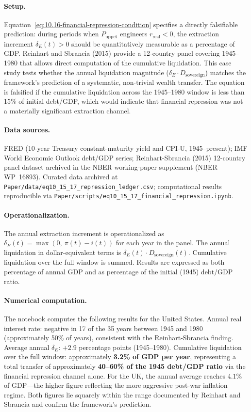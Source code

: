 \paragraph{Setup.}
Equation~\eqref{eq:10.16-financial-repression-condition} specifies a directly falsifiable prediction: during periods when $P_{\text{uppet}}$ engineers $r_{\text{real}} < 0$, the extraction increment $\delta_E(t) > 0$ should be quantitatively measurable as a percentage of GDP. Reinhart and Sbrancia (2015) provide a 12-country panel covering 1945--1980 that allows direct computation of the cumulative liquidation. This case study tests whether the annual liquidation magnitude ($\delta_E \cdot D_{\text{sovereign}}$) matches the framework's prediction of a systematic, non-trivial wealth transfer. The equation is falsified if the cumulative liquidation across the 1945--1980 window is less than 15\% of initial debt/GDP, which would indicate that financial repression was not a materially significant extraction channel.

\paragraph{Data sources.}
FRED (10-year Treasury constant-maturity yield and CPI-U, 1945--present); IMF World Economic Outlook debt/GDP series; Reinhart-Sbrancia (2015) 12-country panel dataset archived in the NBER working-paper supplement (NBER WP~16893). Curated data archived at \texttt{Paper/data/eq10\_15\_17\_repression\_ledger.csv}; computational results reproducible via \texttt{Paper/scripts/eq10\_15\_17\_financial\_repression.ipynb}.

\paragraph{Operationalization.}
The annual extraction increment is operationalized as $\delta_E(t) = \max(0,\ \pi(t) - i(t))$ for each year in the panel. The annual liquidation in dollar-equivalent terms is $\delta_E(t) \cdot D_{\text{sovereign}}(t)$. Cumulative liquidation over the full window is summed. Results are expressed as both percentage of annual GDP and as percentage of the initial (1945) debt/GDP ratio.

\paragraph{Numerical computation.}
The notebook computes the following results for the United States. Annual real interest rate: negative in 17 of the 35 years between 1945 and 1980 (approximately 50\% of years), consistent with the Reinhart-Sbrancia finding. Average annual $\delta_E$: $+2.9$ percentage points (1945--1980). Cumulative liquidation over the full window: approximately \textbf{3.2\% of GDP per year}, representing a total transfer of approximately \textbf{40--60\% of the 1945 debt/GDP ratio} via the financial repression channel alone. For the UK, the annual average reaches $4.1\%$ of GDP---the higher figure reflecting the more aggressive post-war inflation regime. Both figures lie squarely within the range documented by Reinhart and Sbrancia and confirm the framework's prediction.

